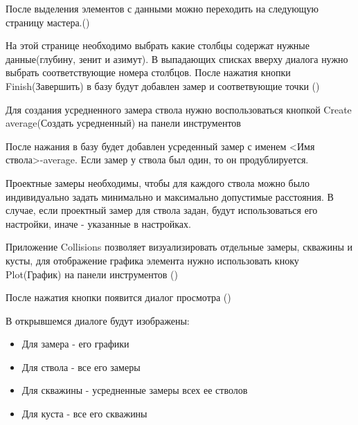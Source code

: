
После выделения элементов с данными можно переходить на следующую страницу мастера.()


На этой странице необходимо выбрать какие столбцы содержат нужные данные(глубину, зенит и азимут). В выпадающих списках вверху диалога нужно выбрать соответствующие номера столбцов.
После нажатия кнопки Finish(Завершить) в базу будут добавлен замер и соответвующие точки ()


Для создания усредненного замера ствола нужно воспользоваться кнопкой Create average(Создать усредненный) на панели инструментов


После нажания в базу будет добавлен усреденный замер с именем <Имя ствола>-average. Если замер у ствола был один, то он продублируется.

Проектные замеры необходимы, чтобы для каждого ствола можно было индивидуально задать минимально и максимально допустимые расстояния.
В случае, если проектный замер для ствола задан, будут использоваться его настройки, иначе - указанные в настройках.

Приложение Collisions позволяет визуализировать отдельные замеры, скважины и кусты, для отображение графика элемента нужно использовать кноку Plot(График) на панели инструментов
()


После нажатия кнопки появится диалог просмотра ()


В открывшемся диалоге будут изображены:
\begin{itemize}
  \item Для замера - его графики
  \item Для ствола - все его замеры
  \item Для скважины - усредненные замеры всех ее стволов
  \item Для куста - все его скважины
\end{itemize}

